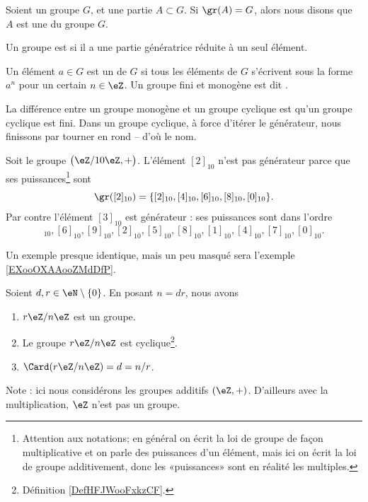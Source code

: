 \begin{definition}  \label{DEFooWMFVooLDqVxR}
	Soient un groupe \( G\), et une partie \( A\subset G\). Si \( \gr(A)=G\), alors nous disons que \( A\) est une  du groupe \( G\).

	Un groupe est  si il a une partie génératrice réduite à un seul élément.
\end{definition}

\begin{definition}     \label{DefHFJWooFxkzCF}
	Un élément \( a\in G\) est un  de \( G\) si tous les éléments de \( G\) s'écrivent sous la forme \( a^n\) pour un certain \( n\in\eZ\). Un groupe fini et monogène est dit .
\end{definition}

\begin{normaltext}
	La différence entre un groupe monogène et un groupe cyclique est qu'un groupe cyclique est fini. Dans un groupe cyclique, à force d'itérer le générateur, nous finissons par tourner en rond -- d'où le nom.
\end{normaltext}

\begin{example}
	Soit le groupe \( \big( \eZ/10\eZ,+ \big)\). L'élément \( [2]_{10}\) n'est pas générateur parce que ses puissances\footnote{Attention aux notations; en général on écrit la loi de groupe de façon multiplicative et on parle des puissances d'un élément, mais ici on écrit la loi de groupe additivement, donc les «puissances» sont en réalité les multiples.} sont
	\begin{equation}
		\gr([2]_{10})=\{ [2]_{10},[4]_{10},[6]_{10},[8]_{10},[0]_{10} \}.
	\end{equation}
	Par contre l'élément \( [3]_{10}\) est générateur : ses puissances sont dans l'ordre
	\begin{equation}
		[3]_{10}, [6]_{10}, [9]_{10}, [2]_{10}, [5]_{10}, [8]_{10},[1]_{10},[4]_{10},[7]_{10},[0]_{10}.
	\end{equation}
\end{example}

Un exemple presque identique, mais un peu masqué sera l'exemple \ref{EXooOXAAooZMdDfP}.


\begin{lemma}        \label{LEMooTHBIooJPjBlp}
	Soient \( d,r\in \eN\setminus\{ 0 \}\). En posant \( n=dr\), nous avons
	\begin{enumerate}
		\item		\label{ITEMooEZFVooPqjAAN}
		      \( r\eZ/n\eZ\) est un groupe.
		\item   \label{LEMooSAAXooMezYui}
		      Le groupe \( r\eZ/n\eZ\) est cyclique\footnote{Définition \ref{DefHFJWooFxkzCF}.}.
		\item       \label{ITEMooGCGQooIfZULt}
		      \( \Card(r\eZ/n\eZ)=d=n/r\).
	\end{enumerate}
	Note : ici nous considérons les groupes additifs \( (\eZ,+)\). D'ailleurs avec la multiplication, \( \eZ\) n'est pas un groupe.
\end{lemma}

